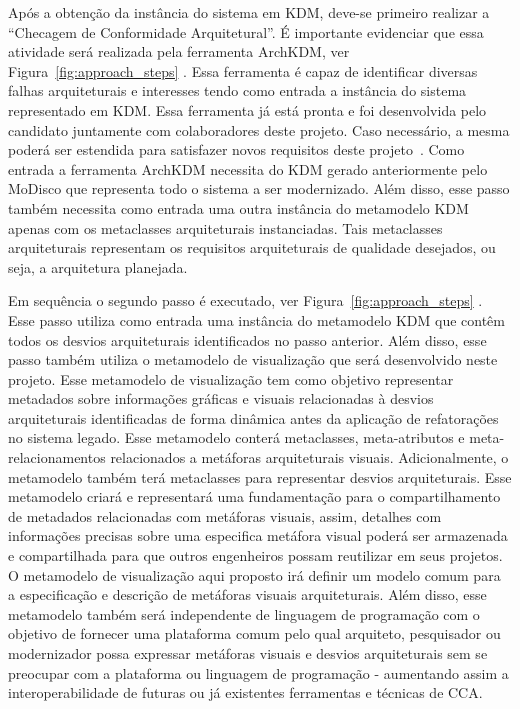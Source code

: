 \documentclass[12pt]{article}
\begin{document}
Após a obtenção da instância do sistema em KDM, deve-se primeiro realizar a ``Checagem de Conformidade Arquitetural''. É importante evidenciar que essa atividade será realizada pela ferramenta ArchKDM, ver Figura~\ref{fig:approach_steps} . Essa ferramenta é capaz de identificar diversas falhas arquiteturais e interesses tendo como entrada a instância do sistema representado em KDM. Essa ferramenta já está pronta e foi desenvolvida pelo candidato juntamente com colaboradores deste projeto. Caso necessário, a mesma poderá ser estendida para satisfazer novos requisitos deste projeto~\cite{source_miner_glauco, daniel_san_journal}. Como entrada a ferramenta ArchKDM necessita do KDM gerado anteriormente pelo MoDisco que representa todo o sistema a ser modernizado. Além disso, esse passo também necessita como entrada uma outra instância do metamodelo KDM apenas com os metaclasses arquiteturais instanciadas. Tais metaclasses arquiteturais representam os requisitos arquiteturais de qualidade desejados, ou seja, a arquitetura planejada.  

Em sequência o segundo passo é executado, ver Figura~\ref{fig:approach_steps} . Esse passo utiliza como entrada uma instância do metamodelo KDM que contêm todos os desvios arquiteturais identificados no passo anterior. Além disso, esse passo também utiliza o metamodelo de visualização que será desenvolvido neste projeto. Esse metamodelo de visualização tem como objetivo representar metadados sobre informações gráficas e visuais relacionadas à desvios arquiteturais identificadas de forma dinâmica antes da aplicação de refatorações no sistema legado. Esse metamodelo conterá metaclasses, meta-atributos e meta-relacionamentos relacionados a metáforas arquiteturais visuais. Adicionalmente, o metamodelo também terá metaclasses para representar desvios arquiteturais. Esse metamodelo criará e representará uma fundamentação para o compartilhamento de metadados relacionadas com metáforas visuais, assim, detalhes com informações precisas sobre uma especifica metáfora visual poderá ser armazenada e compartilhada para que outros engenheiros possam reutilizar em seus projetos. O metamodelo de visualização aqui proposto irá definir um modelo comum para a especificação e descrição de metáforas visuais arquiteturais. Além disso, esse metamodelo também será independente de linguagem de programação com o objetivo de fornecer uma plataforma comum pelo qual arquiteto, pesquisador ou modernizador possa expressar metáforas visuais e desvios arquiteturais sem se preocupar com a plataforma ou linguagem de programação - aumentando assim a interoperabilidade de futuras ou já existentes ferramentas e técnicas de CCA.
\end{document}
